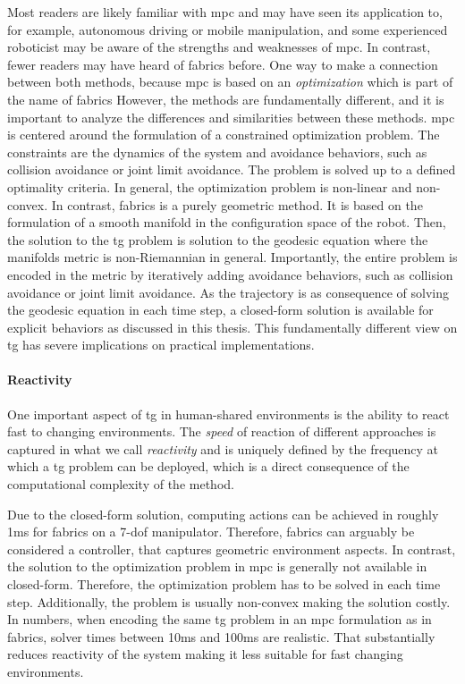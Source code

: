Most readers are likely familiar with \acl{mpc} and may have seen its application
to, for example, autonomous driving or mobile manipulation, and some 
experienced roboticist may be aware of the strengths and weaknesses of
\ac{mpc}. In contrast, fewer readers may have heard of \ac{fabrics} before.
One way to make a connection between both methods, because
\ac{mpc} is based on an \textit{optimization} which is part
of the name of \acf{fabrics}
However, the methods are
fundamentally different,
and it is important to analyze the differences and similarities between
these methods.
\ac{mpc} is centered around the
formulation of a constrained optimization problem. The constraints are
the dynamics of the system and avoidance behaviors, such as collision avoidance
or joint limit avoidance. The problem is solved up to a defined optimality 
criteria. In general, the optimization problem is non-linear and non-convex.
In contrast, \ac{fabrics} is a purely geometric method. It is based on the
formulation of a smooth manifold in the configuration space of the robot.
Then, the solution to the \ac{tg} problem is solution to the geodesic equation
where the manifolds metric is non-Riemannian in general. Importantly, the entire
problem is encoded in the metric by iteratively adding avoidance
behaviors, such as collision avoidance or joint limit avoidance. As the
trajectory is as consequence of solving the geodesic equation in each time step, a
closed-form solution is available for explicit behaviors as discussed in this
thesis.
This fundamentally different view on \ac{tg} has severe implications on
practical implementations.

\paragraph{Reactivity}
\label{par:discussion_reactivity}

One important aspect of \ac{tg} in human-shared environments is the ability to
react fast to changing environments. The \textit{speed} of reaction
of different approaches is captured in what we call
\textit{reactivity} and is uniquely defined by the frequency
at which a \ac{tg} problem can be deployed, which is a
direct consequence of the computational complexity of the
method.

Due to the closed-form solution, computing actions can be
achieved in roughly 1ms for \ac{fabrics} on a 7-\ac{dof}
manipulator. Therefore, \ac{fabrics} can arguably be
considered a controller, that captures geometric environment
aspects. In contrast, the solution to the optimization
problem in \ac{mpc} is generally not available in
closed-form. Therefore, the optimization problem has to be 
solved in each time step. Additionally, the problem is
usually non-convex making the solution costly. In numbers,
when encoding the same \ac{tg} problem in an \ac{mpc}
formulation as in \ac{fabrics}, solver times between 10ms
and 100ms are realistic. That substantially reduces
reactivity of the system making it less suitable for fast
changing environments.


